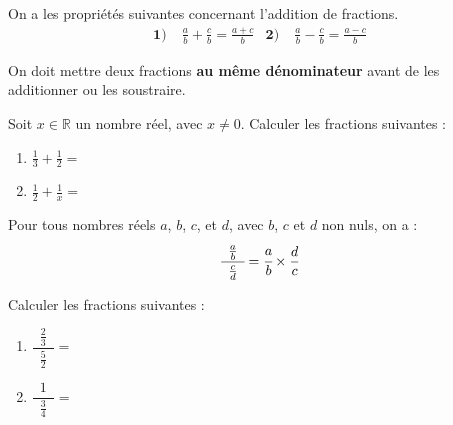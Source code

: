 \documentclass[11pt]{article}
\begin{document}
\begin{prop}
  On a les propriétés suivantes concernant l'addition de fractions.
  \begin{align*}
    \textbf{1)}\;& \frac{a}{b}+\frac{c}{b} = \frac{a+c}{b} &
    \textbf{2)}\;& \frac{a}{b}-\frac{c}{b}= \frac{a-c}{b}
  \end{align*}
\end{prop}
\begin{rmq}
  On doit mettre deux fractions \textbf{au même dénominateur} avant de
  les additionner ou les soustraire.
\end{rmq}
\begin{app}
  Soit $x\in\mathbb{R}$ un nombre réel, avec $x\neq0$. Calculer les fractions suivantes :
 \begin{enumerate}
   \item $\frac{1}{3}+\frac{1}{2} = $
   \item $\frac{1}{2}+\frac{1}{x} = $
 \end{enumerate}
\end{app}
\begin{prop}
  Pour tous nombres réels $a$, $b$, $c$, et $d$, avec $b$, $c$ et $d$ non nuls,
  on a :
  \[
    \cfrac{\phantom{1}\frac{a}{b}\phantom{1}}{\frac{c}{d}} =
    \cfrac{a}{b}\times\frac{d}{c}
  \]
\end{prop}
\begin{app}
  Calculer les fractions suivantes :
  \begin{enumerate}
    \item $\dfrac{\phantom{1}\frac{2}{3}\phantom{1}}{\frac{5}{2}} = $
    \item $\dfrac{\phantom{1}1\phantom{1}}{\frac{3}{4}} = $
  \end{enumerate}
\end{app}
\end{document}
